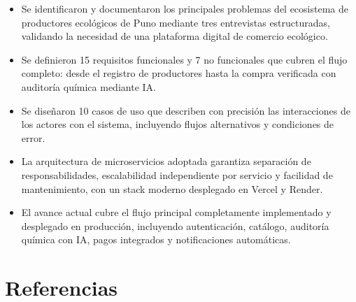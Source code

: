 \documentclass[12pt,a4paper]{article}
\begin{document}
\begin{itemize}[leftmargin=1.5cm]
  \item Se identificaron y documentaron los principales problemas del ecosistema de
    productores ecol\'ogicos de Puno mediante tres entrevistas estructuradas,
    validando la necesidad de una plataforma digital de comercio ecol\'ogico.

  \item Se definieron 15 requisitos funcionales y 7 no funcionales que cubren el flujo
    completo: desde el registro de productores hasta la compra verificada con
    auditor\'ia qu\'imica mediante IA.

  \item Se dise\~naron 10 casos de uso que describen con precisi\'on las interacciones de
    los actores con el sistema, incluyendo flujos alternativos y condiciones de error.

  \item La arquitectura de microservicios adoptada garantiza separaci\'on de
    responsabilidades, escalabilidad independiente por servicio y facilidad de
    mantenimiento, con un stack moderno desplegado en Vercel y Render.

  \item El avance actual cubre el flujo principal completamente implementado y
    desplegado en producci\'on, incluyendo autenticaci\'on, cat\'alogo, auditor\'ia
    qu\'imica con IA, pagos integrados y notificaciones autom\'aticas.
\end{itemize}

\section*{Referencias}
\end{document}
